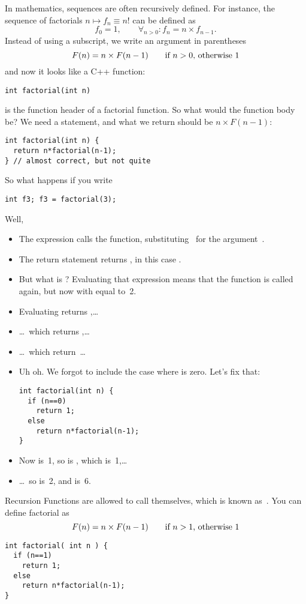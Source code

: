 In mathematics, sequences are often recursively defined. For instance,
the sequence of factorials $n\mapsto f_n\equiv n!$ can be defined as
\[ f_0=1,\qquad \forall_{n>0}\colon f_n=n\times f_{n-1}. \]
Instead of using a subscript, we write an argument in parentheses
\[ F(n) = n \times F(n-1) \qquad \hbox{if $n>0$, otherwise~$1$} \]
and now it looks like a C++ function:
\begin{verbatim}
int factorial(int n)
\end{verbatim}
is the function header of a factorial function. So what would the
function body be? We need a  statement, and what we return
should be $n \times F(n-1)$:
\begin{verbatim}
int factorial(int n) {
  return n*factorial(n-1);
} // almost correct, but not quite
\end{verbatim}
So what happens if you write
\begin{verbatim}
int f3; f3 = factorial(3);
\end{verbatim}
Well,
\begin{itemize}
\item The expression  calls the 
  function, substituting~ for the argument~.
\item The return statement returns , in this case
  .
\item But what is ? Evaluating that expression means
  that the  function is called again, but now with 
  equal to~2.
\item Evaluating  returns ,\ldots
\item \ldots~which returns ,\ldots
\item \ldots~which return~\ldots
\item Uh oh. We forgot to include the case where  is zero. Let's
  fix that:
\begin{verbatim}
int factorial(int n) {
  if (n==0)
    return 1;
  else
    return n*factorial(n-1);
}
\end{verbatim}
\item Now  is~1, so  is
  , which is~1,\ldots
\item \ldots~so  is~2, and  is~6.
\end{itemize}

\begin{slide}{Recursion}
  \label{sl:func-recur}
  Functions are allowed to call themselves, which is known
  as~. You can define factorial as
  \[ F(n) = n \times F(n-1) \qquad \hbox{if $n>1$, otherwise~$1$} \]
\begin{verbatim}
int factorial( int n ) {
  if (n==1)
    return 1;
  else
    return n*factorial(n-1);
}
\end{verbatim}
\end{slide}


